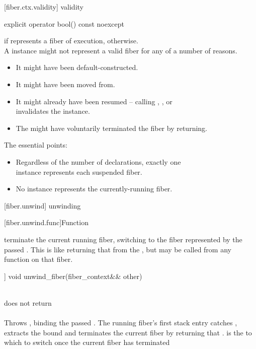 [fiber.ctx.validity]{ validity}

%
\begin{itemdecl}
explicit operator bool() const noexcept
\end{itemdecl}

\begin{itemdescr}
\pnum
\returns {} if  represents a fiber of execution,
 otherwise.\\
A \fiber instance might not represent a valid fiber for any of a number of
reasons.
\begin{itemize}
    \item It might have been default-constructed.
    \item It might have been moved from.
    \item It might already have been resumed -- calling \resume, \resumewith,
          \xtresume or\\
          \xtresumewith invalidates the instance.
    \item The \entryfn\xspace might have voluntarily terminated the fiber by
          returning.
\end{itemize}
The essential points:
\begin{itemize}
    \item Regardless of the number of \fiber declarations, exactly one\\
          \fiber instance represents each suspended fiber.
    \item No \fiber instance represents the currently-running fiber.
\end{itemize}
\end{itemdescr}



[fiber.unwind]{ unwinding}

[fiber.unwind.func]{Function }

terminate the current running fiber, switching to the fiber represented by the
passed \fiber. This is like returning that \fiber from the \entryfn, but may be
called from any function on that fiber.

\begin{itemdecl}
[[ noreturn ]] void unwind_fiber(fiber_context&& other)
\end{itemdecl}

\begin{itemdescr}
\pnum
\preconditions {}\\
\returns does not return\\
\throws \unwindex\\
Throws \unwindex, binding the passed \fiber. The running fiber's first stack
entry catches \unwindex, extracts the bound \fiber and terminates the current
fiber by returning that \fiber.  is the \fiber to which to switch
once the current fiber has terminated
\end{itemdescr}



